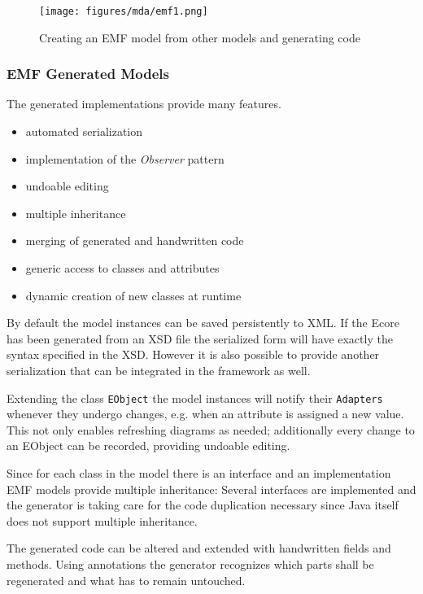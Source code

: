 \begin{figure}[htp]
	\centering
	\texttt{[image: figures/mda/emf1.png]}
	\caption[Code generation with EMF]{Creating an EMF model from other models and generating code}
	\label{fig:emf1}
\end{figure}


\subsubsection*{EMF Generated Models}

The generated implementations provide many features.

\begin{itemize}
	\item automated serialization
	\item implementation of the \emph{Observer} pattern
	\item undoable editing
	\item multiple inheritance
	\item merging of generated and handwritten code
	\item generic access to classes and attributes
	\item dynamic creation of new classes at runtime
\end{itemize}

By default the model instances can be saved persistently to XML. If the Ecore has been generated from an XSD file the serialized form will have exactly the syntax specified in the XSD. However it is also possible to provide another serialization that can be integrated in the framework as well.

Extending the class \verb|EObject| the model instances will notify their \verb|Adapters| whenever they undergo changes, e.g. when an attribute is assigned a new value. This not only enables refreshing diagrams as needed; additionally every change to an EObject can be recorded, providing undoable editing.

Since for each class in the model there is an interface and an implementation EMF models provide multiple inheritance: Several interfaces are implemented and the generator is taking care for the code duplication necessary since Java itself does not support multiple inheritance.

The generated code can be altered and extended with handwritten fields and methods. Using annotations the generator recognizes which parts shall be regenerated and what has to remain untouched.

